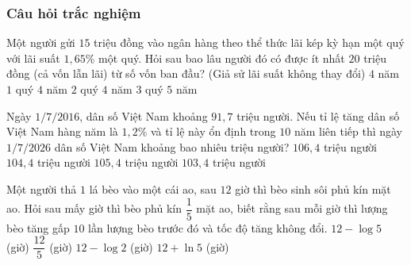 \subsubsection{Câu hỏi trắc nghiệm}
\begin{ex}%
	Một người gửi $15$ triệu đồng vào ngân hàng theo thể thức lãi kép kỳ hạn một quý với lãi suất $1{,}65\%$ một quý. Hỏi sau bao lâu người đó có được ít nhất $20$ triệu đồng (cả vốn lẫn lãi) từ số vốn ban đầu? (Giả sử lãi suất không thay đổi)
	\choice
	{$4$ năm $1$ quý}
	{\True $4$ năm $2$ quý}
	{$4$ năm $3$ quý}
	{$5$ năm}
\end{ex}
\begin{ex}%
	Ngày $1/7/2016$, dân số Việt Nam khoảng $91{,}7$ triệu người. Nếu tỉ lệ tăng dân số Việt Nam hàng năm là $1{,}2$\% và tỉ lệ này ổn định trong $10$ năm liên tiếp thì ngày $1/7/2026$ dân số Việt Nam khoảng bao nhiêu triệu người?
	\choice
	{$106{,}4$ triệu người}
	{$104{,}4$ triệu người}
	{$105{,}4$ triệu người}
	{\True $103{,}4$ triệu người}
\end{ex}
\begin{ex}%
	Một người thả $1$ lá bèo vào một cái ao, sau $12$ giờ thì bèo sinh sôi phủ kín mặt ao. Hỏi sau mấy giờ thì bèo phủ kín $\dfrac{1}{5}$ mặt ao, biết rằng sau mỗi giờ thì lượng bèo tăng gấp $10$ lần lượng bèo trước đó và tốc độ tăng không đổi. 
	\choice
	{\True $12-\log 5$ (giờ)}
	{$\dfrac{12}{5}$ (giờ)}
	{$12-\log 2$ (giờ)}
	{$12+\ln 5$ (giờ)}
\end{ex}
